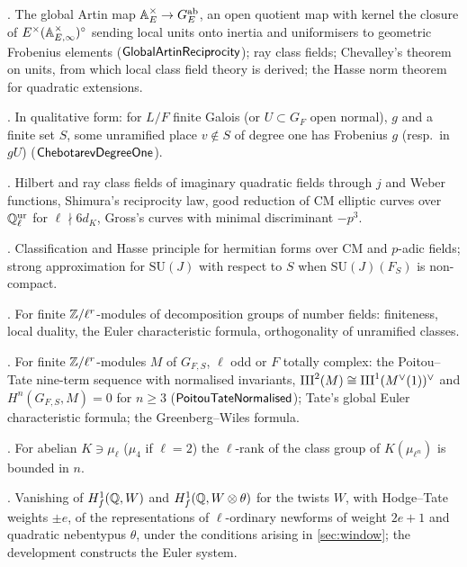 \begin{description}[leftmargin=0pt,itemsep=1pt,parsep=0pt,font=\normalfont\itshape]
\item[Class field theory] \cite{Artin1927,Tate1967gcft,Chevalley1951}.  The global Artin map
  $\mathbb{A}_E^\times\to G_E^{\mathrm{ab}}$, an open quotient map with kernel the closure of
  $E^\times(\mathbb{A}_{E,\infty}^\times)^\circ$ sending local units onto inertia and uniformisers to geometric
  Frobenius elements ($\mathsf{GlobalArtinReciprocity}$); ray class fields; Chevalley's theorem on
  units, from which local class field theory is derived; the Hasse norm theorem for quadratic
  extensions.  
\item[Chebotarev's theorem] \cite{Chebotarev1926}.  In qualitative form: for $L/F$ finite Galois
  (or $U\subset G_F$ open normal), $g$ and a finite set $S$, some unramified place $v\notin S$ of
  degree one has Frobenius $g$ (resp.\ in $gU$) ($\mathsf{ChebotarevDegreeOne}$).
\item[Complex multiplication] \cite{Shimura1971,Silverman1994,SerreTate1968,Gross1980}.  Hilbert and
  ray class fields of imaginary quadratic fields through $j$ and Weber functions, Shimura's
  reciprocity law, good reduction of CM elliptic curves over $\mathbb{Q}_\ell^{\mathrm{ur}}$ for
  $\ell\nmid6d_K$, Gross's curves with minimal discriminant $-p^3$.  
\item[Hermitian forms, strong approximation]
  \cite{Landherr1936,Jacobowitz1962,Kneser1966,PlatonovRapinchuk1994}.  Classification and Hasse
  principle for hermitian forms over CM and $p$-adic fields; strong approximation for $\mathrm{SU}(J)$
  with respect to $S$ when $\mathrm{SU}(J)(F_S)$ is non-compact.  
\item[Local Galois cohomology] \cite{Tate1963,NeukirchSchmidtWingberg2008}.  For finite
  $\mathbb{Z}/\ell^r$-modules of decomposition groups of number fields: finiteness, local duality, the
  Euler characteristic formula, orthogonality of unramified classes.  
\item[Global duality] \cite{Tate1963,Milne2006,Wiles1995}.  For finite $\mathbb{Z}/\ell^r$-modules $M$ of
  $G_{F,S}$, $\ell$ odd or $F$ totally complex: the Poitou--Tate nine-term sequence with normalised
  invariants, $\mathrm{III}^2(M)\cong\mathrm{III}^1(M^\vee(1))^\vee$ and $H^n(G_{F,S},M)=0$ for $n\ge3$
  ($\mathsf{PoitouTateNormalised}$); Tate's global Euler characteristic formula; the
  Greenberg--Wiles formula.  
\item[Ferrero--Washington theorem] \cite{FerreroWashington1979}.  For abelian $K\ni\mu_\ell$
  ($\mu_4$ if $\ell=2$) the $\ell$-rank of the class group of $K(\mu_{\ell^n})$ is bounded in $n$.
\item[Kato's theorem] \cite[Thm.~14.2]{Kato2004}.  Vanishing of $H^1_f(\mathbb{Q},W)$ and
  $H^1_f(\mathbb{Q},W\otimes\theta)$ for the twists $W$, with Hodge--Tate weights $\pm e$, of the
  representations of $\ell$-ordinary newforms of weight $2e+1$ and quadratic nebentypus $\theta$, under
  the conditions arising in \cref{sec:window}; the development constructs the Euler system.
\end{description}

